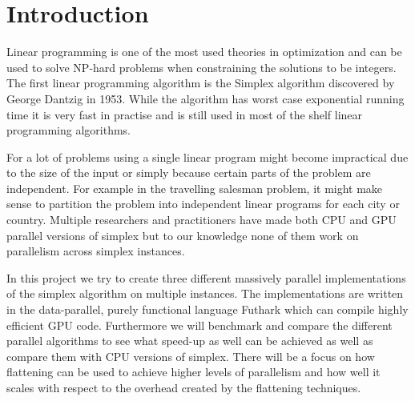 \section{Introduction}
Linear programming is one of the most used theories in optimization and can be used to solve NP-hard problems when constraining the solutions to be integers. The first linear programming algorithm is the Simplex algorithm discovered by George Dantzig in 1953. While the algorithm has worst case exponential running time it is very fast in practise and is still used in most of the shelf linear programming algorithms. 

For a lot of problems using a single linear program might become impractical due to the size of the input or simply because certain parts of the problem are independent. For example in the travelling salesman problem, it might make sense to partition the problem into independent linear programs for each city or country. Multiple researchers and practitioners have made both CPU and GPU parallel versions of simplex but to our knowledge none of them work on parallelism across simplex instances.

\newpar In this project we try to create three different massively parallel implementations of the simplex algorithm on multiple instances. The implementations are written in the data-parallel, purely functional language Futhark which can compile highly efficient GPU code. Furthermore we will benchmark and compare the different parallel algorithms to see what speed-up as well can be achieved as well as compare them with CPU versions of simplex. There will be a focus on how flattening can be used to achieve higher levels of parallelism and how well it scales with respect to the overhead created by the flattening techniques.

